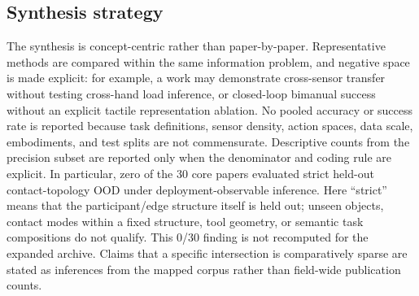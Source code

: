 \subsection{Synthesis strategy}

The synthesis is concept-centric rather than paper-by-paper. Representative
methods are compared within the same information problem, and negative space is
made explicit: for example, a work may demonstrate cross-sensor transfer without
testing cross-hand load inference, or closed-loop bimanual success without an
explicit tactile representation ablation. No pooled accuracy or success rate is
reported because task definitions, sensor density, action spaces, data scale,
embodiments, and test splits are not commensurate. Descriptive counts from the
precision subset are reported only when the denominator and coding rule are
explicit. In particular, zero of the 30 core papers evaluated strict held-out
contact-topology OOD under deployment-observable inference. Here ``strict'' means
that the participant/edge structure itself is held out; unseen objects, contact
modes within a fixed structure, tool geometry, or semantic task compositions do
not qualify. This 0/30 finding is not recomputed for the expanded archive. Claims that a specific intersection is comparatively sparse are
stated as inferences from the mapped corpus rather than field-wide publication
counts.
